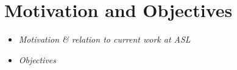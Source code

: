 \section{Motivation and Objectives}
\label{sec:Motivation and Objectives}

\begin{itemize}
	\item \emph{Motivation \& relation to current work at ASL}
	\item \emph{Objectives}
\end{itemize}